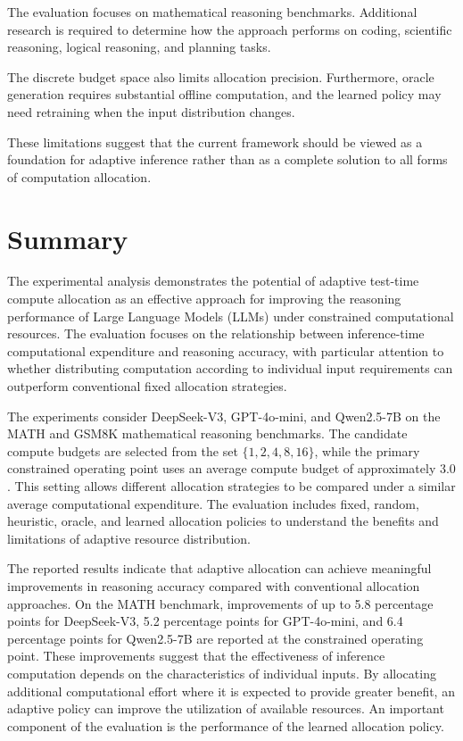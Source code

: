 \documentclass[12pt,a4paper,titlepage]{report}
\begin{document}
The evaluation focuses on mathematical reasoning benchmarks. Additional research is required to determine how the approach performs on coding, scientific reasoning, logical reasoning, and planning tasks.

The discrete budget space also limits allocation precision. Furthermore, oracle generation requires substantial offline computation, and the learned policy may need retraining when the input distribution changes.

These limitations suggest that the current framework should be viewed as a foundation for adaptive inference rather than as a complete solution to all forms of computation allocation.

\section{Summary}

The experimental analysis demonstrates the potential of adaptive test-time compute allocation as an effective approach for improving the reasoning performance of Large Language Models (LLMs) under constrained computational resources. The evaluation focuses on the relationship between inference-time computational expenditure and reasoning accuracy, with particular attention to whether distributing computation according to individual input requirements can outperform conventional fixed allocation strategies.

The experiments consider DeepSeek-V3, GPT-4o-mini, and Qwen2.5-7B on the MATH and GSM8K mathematical reasoning benchmarks. The candidate compute budgets are selected from the set \(\{1,2,4,8,16\}\), while the primary constrained operating point uses an average compute budget of approximately \(3.0\). This setting allows different allocation strategies to be compared under a similar average computational expenditure. The evaluation includes fixed, random, heuristic, oracle, and learned allocation policies to understand the benefits and limitations of adaptive resource distribution.

The reported results indicate that adaptive allocation can achieve meaningful improvements in reasoning accuracy compared with conventional allocation approaches. On the MATH benchmark, improvements of up to 5.8 percentage points for DeepSeek-V3, 5.2 percentage points for GPT-4o-mini, and 6.4 percentage points for Qwen2.5-7B are reported at the constrained operating point. These improvements suggest that the effectiveness of inference computation depends on the characteristics of individual inputs. By allocating additional computational effort where it is expected to provide greater benefit, an adaptive policy can improve the utilization of available resources. An important component of the evaluation is the performance of the learned allocation policy. 
\end{document}
